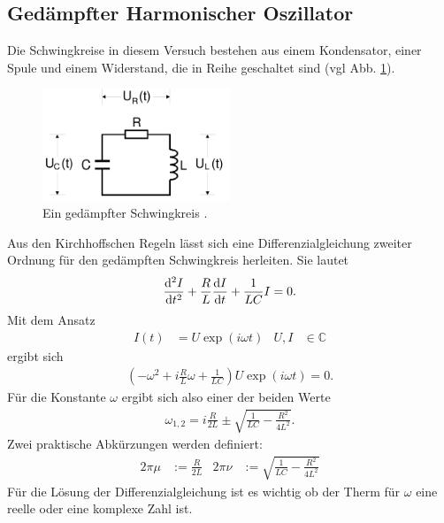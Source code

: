 \subsection{Gedämpfter Harmonischer Oszillator}
Die Schwingkreise in diesem Versuch bestehen aus einem Kondensator, einer Spule und einem Widerstand, 
die in Reihe geschaltet sind (vgl Abb. \ref{fig:ged_Schwingkreis_Schema}).
\begin{figure}[H]
    \centering
    \includegraphics[width=0.5\textwidth]{Abbildungen/ged_Schwingkreis_Schema.png}
    \caption{Ein gedämpfter Schwingkreis \cite{man:v354}.}
    \label{fig:ged_Schwingkreis_Schema}
\end{figure}
Aus den Kirchhoffschen Regeln lässt sich eine Differenzialgleichung zweiter Ordnung für den gedämpften Schwingkreis herleiten.
Sie lautet
\begin{align}
    \frac{\mathop{}\!\mathrm{d}^2 I}{\mathop{}\!\mathrm{d} t^2}+ \frac{R}{L} \frac{\mathop{}\!\mathrm{d} I}{\mathop{}\!\mathrm{d} t} + \frac{1}{LC}I = 0 . 
    \label{eq:Hom_DGL}
\end{align}
Mit dem Ansatz
\begin{align*}
    I(t) &= U \exp(i\omega t) & U, I &\in \mathbb{C} 
\end{align*}
ergibt sich
\begin{align*}
    (- \omega^2 + i \frac{R}{L} \omega + \frac{1}{LC}) U \exp(i\omega t)  =0 .
\end{align*}
Für die Konstante $\omega$ ergibt sich also einer der beiden Werte
\begin{align*}
    \omega_{1,2} = i \frac{R}{2L} \pm \sqrt{\frac{1}{LC}-\frac{R^2}{4L^2}}.
\end{align*}
Zwei praktische Abkürzungen werden definiert:
\begin{align*}
    2\pi \mu &:= \frac{R}{2L} & 2 \pi \stackrel{~}{\nu} &:=  \sqrt{\frac{1}{LC}-\frac{R^2}{4L^2}}
\end{align*}
Für die Lösung der Differenzialgleichung ist es wichtig ob der Therm für $\omega$ eine reelle oder eine komplexe Zahl ist.

